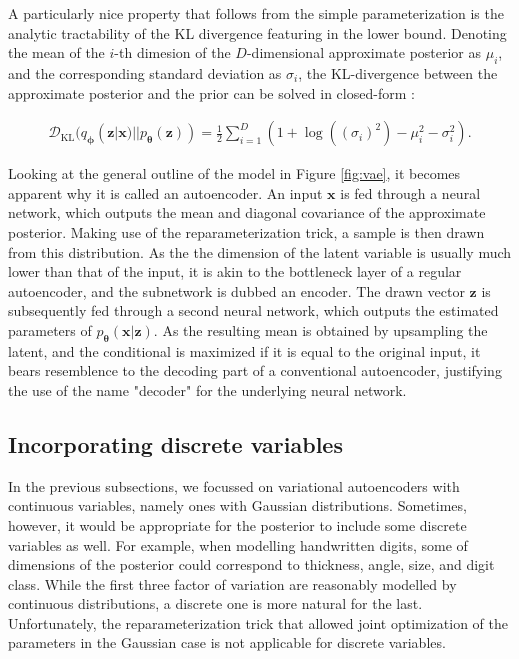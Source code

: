 \documentclass{report}
\begin{document}
\noindent A particularly nice property that follows from the simple parameterization is the analytic tractability of the KL divergence featuring in the lower bound. Denoting the mean of the $i$-th dimesion of the $D$-dimensional approximate posterior as $\mu_i$, and the corresponding standard deviation as $\sigma_i$, the KL-divergence between the approximate posterior and the prior can be solved in closed-form \cite{vae}:

\begin{equation}
\begin{gathered}
\mathcal{D}_\text{KL}(q_{\boldsymbol{\phi}}(\boldsymbol{z}|\boldsymbol{x}) || p_{\boldsymbol{\theta}}(\boldsymbol{z})) = \frac{1}{2} \sum_{i=1}^D (1 + \log((\sigma_i)^2) - \mu_i^2 - \sigma_i^2).
\end{gathered}
\end{equation}

\bigskip

\noindent Looking at the general outline of the model in Figure \ref{fig:vae}, it becomes apparent why it is called an autoencoder. An input $\boldsymbol{x}$ is fed through a neural network, which outputs the mean and diagonal covariance of the approximate posterior. Making use of the reparameterization trick, a sample is then drawn from this distribution. As the the dimension of the latent variable is usually much lower than that of the input, it is akin to the bottleneck layer of a regular autoencoder, and the subnetwork is dubbed an encoder. The drawn vector $\boldsymbol{z}$ is subsequently fed through a second neural network, which outputs the estimated parameters of $p_{\boldsymbol{\theta}}(\boldsymbol{x}|\boldsymbol{z})$. As the resulting mean is obtained by upsampling the latent, and the conditional is maximized if it is equal to the original input, it bears resemblence to the decoding part of a conventional autoencoder, justifying the use of the name "decoder" for the underlying neural network.

\subsection{Incorporating discrete variables}

In the previous subsections, we focussed on variational autoencoders with continuous variables, namely ones with Gaussian distributions. Sometimes, however, it would be appropriate for the posterior to include some discrete variables as well. For example, when modelling handwritten digits, some of dimensions of the posterior could correspond to thickness, angle, size, and digit class. While the first three factor of variation are reasonably modelled by continuous distributions, a discrete one is more natural for the last. Unfortunately, the reparameterization trick that allowed joint optimization of the parameters in the Gaussian case is not applicable for discrete variables. \\
\end{document}
